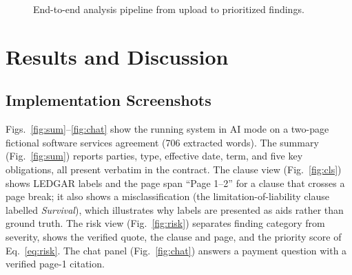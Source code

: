 \documentclass[conference]{IEEEtran}
\begin{document}
\begin{figure}[t]
\centering
{}
\caption{End-to-end analysis pipeline from upload to prioritized findings.}
\label{fig:flow}
\end{figure}

\section{Results and Discussion}
\subsection{Implementation Screenshots}
Figs.~\ref{fig:sum}--\ref{fig:chat} show the running system in AI mode on a two-page fictional software services agreement (706 extracted words). The summary (Fig.~\ref{fig:sum}) reports parties, type, effective date, term, and five key obligations, all present verbatim in the contract. The clause view (Fig.~\ref{fig:cls}) shows LEDGAR labels and the page span ``Page 1--2'' for a clause that crosses a page break; it also shows a misclassification (the limitation-of-liability clause labelled \emph{Survival}), which illustrates why labels are presented as aids rather than ground truth. The risk view (Fig.~\ref{fig:risk}) separates finding category from severity, shows the verified quote, the clause and page, and the priority score of Eq.~\eqref{eq:risk}. The chat panel (Fig.~\ref{fig:chat}) answers a payment question with a verified page-1 citation.
\end{document}
